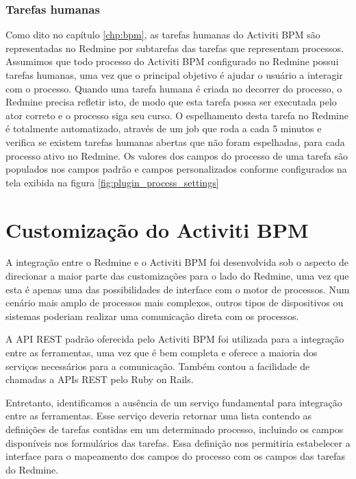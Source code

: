 \subsubsection{Tarefas humanas}\label{sec:integracao_redmine_activiti_implementacao_detalhes_desenvolvimento_sincronizacao_human_task}

Como dito no capítulo  \ref{chp:bpm}, as tarefas humanas do Activiti BPM são representadas no Redmine por subtarefas das tarefas que representam processos. Assumimos que todo processo do Activiti BPM configurado no Redmine possui tarefas humanas, uma vez que o principal objetivo é ajudar o usuário a interagir com o processo.
Quando uma tarefa humana é criada no decorrer do processo, o Redmine precisa refletir isto, de modo que esta tarefa possa ser executada pelo ator correto e o processo siga seu curso. O espelhamento desta tarefa no Redmine é totalmente automatizado, através de um job que roda a cada 5 minutos e verifica se existem tarefas humanas abertas que não foram espelhadas, para cada processo ativo no Redmine. Os valores dos campos do processo de uma tarefa são populados nos campos padrão e campos personalizados conforme configurados na tela exibida na figura \ref{fig:plugin_process_settings}

\section{Customização do Activiti BPM}\label{sec:integracao_redmine_activiti-implementacao-activiti}

A integração entre o Redmine e o Activiti BPM foi desenvolvida sob o aspecto de direcionar a maior parte das customizações para o lado do Redmine, uma vez que esta é apenas uma das possibilidades de interface com o motor de processos. Num cenário mais amplo de processos mais complexos, outros tipos de dispositivos ou sistemas poderiam realizar uma comunicação direta com os processos.

A API REST padrão oferecida pelo Activiti BPM foi utilizada para a integração entre as ferramentas, uma vez que é bem completa e oferece a maioria dos serviços necessários para a comunicação. Também contou a facilidade de chamadas a APIs REST pelo Ruby on Rails. 

Entretanto, identificamos a ausência de um serviço fundamental para integração entre as ferramentas. Esse serviço deveria retornar uma lista contendo as definições de tarefas contidas em um determinado processo, incluindo os campos disponíveis nos formulários das tarefas. Essa definição nos permitiria estabelecer a interface para o mapeamento dos campos do processo com os campos das tarefas do Redmine.

